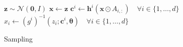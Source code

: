 




\begin{figure}[h]
\begin{algorithm}[H]
  \caption{Sampling} \label{alg:inversion}
  \small
  \begin{algorithmic}[1]
    \State $\mathbf{z} \sim \mathcal{N}(\mathbf{0}, I)$
    \State $\mathbf{x} \gets \mathbf{z}$
    \Repeat
      \State $\mathbf{c}^i \gets \mathbf{h}^i(\mathbf{x} \odot A_{i, :}) \quad \forall i \in \{1, \dots, d\}$
      \State $x_i \gets (g^i)^{-1}(z_i; \mathbf{c}^i, \mathbf{\theta}) \quad \forall i \in \{1, \dots, d\}$
  \end{algorithmic}
\end{algorithm}
\end{figure}
